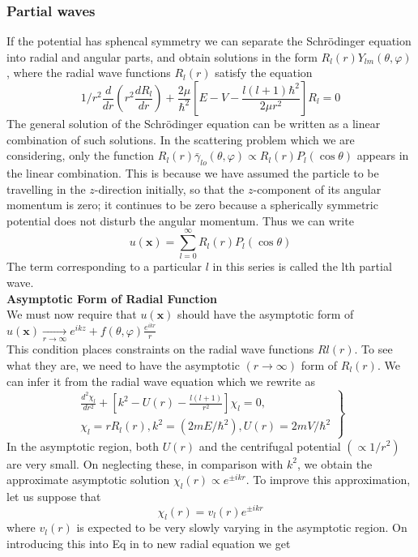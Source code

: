 \subsubsection{Partial waves}
If the potential has sphencal symmetry we can separate the Schrödinger equation into radial and angular parts, and obtain solutions in the form $R_{l}(r) Y_{l m}{(\theta, \varphi)}$, where the radial wave functions $R_{l}(r)$ satisfy the equation
$$
1/r^2 \frac{d}{dr}\left(r^{2} \frac{d R_l}{d r}\right)+\frac{2 \mu}{\hbar^{2}}\left[E-V-\frac{l(l+1) \hbar^{2}}{2 \mu r^{2}}\right] R_l=0
$$
The general solution of the Schrödinger equation can be written as a linear combination of such solutions. In the scattering problem which we are considering, only the function $R_{l}(r) \bar{\gamma}_{l o}(\theta, \varphi) \propto R_{l}(r) P_{l}(\cos \theta)$ appears in the linear combination. This is because we have assumed the particle to be travelling in the $z$-direction initially, so that the $z$-component of its angular momentum is zero; it continues to be zero because a spherically symmetric potential does not disturb the angular momentum. Thus we can write
$$
u(\mathbf{x})=\sum_{l=0}^{\infty} R_{l}(r) P_{l}(\cos \theta)
$$
The term corresponding to a particular $l$ in this series is called the lth partial wave.\\
\textbf{Asymptotic Form of Radial Function}\\
 We must now require that $u(\mathbf{x})$ should have the asymptotic form of$u(\mathbf{x}) \underset{r \rightarrow \infty}{\longrightarrow} e^{i k z}+f(\theta, \varphi) \frac{e^{i k r}}{r}$ \\
  This condition places constraints on the radial wave functions $R l(r)$. To see what they are, we need to have the asymptotic $(r \rightarrow \infty)$ form of $R_{l}(r)$. We can infer it from the radial wave equation  which we rewrite as
$$
\left.\begin{array}{l}
\frac{d^{2} \chi_{l}}{d r^{2}}+\left[k^{2}-U(r)-\frac{l(l+1)}{r^{2}}\right] \chi_{l}=0, \\
\chi_{l}=r R_{l}(r), k^{2}=\left(2 m E / \hbar^{2}\right), U(r)=2 m V / \hbar^{2}
\end{array}\right\}
$$
In the asymptotic region, both $U(r)$ and the centrifugal potential $\left(\propto 1 / r^{2}\right)$ are very small. On neglecting these, in comparison with $k^{2}$, we obtain the approximate asymptotic solution $\chi_{l}(r) \propto e^{\pm i k r}$. To improve this approximation, let us suppose that
$$\chi_{l}(r)=v_{l}(r) e^{\pm i k r}$$
where $v_{l}(r)$ is expected to be very slowly varying in the asymptotic region. On introducing this into Eq in to new radial equation we get
